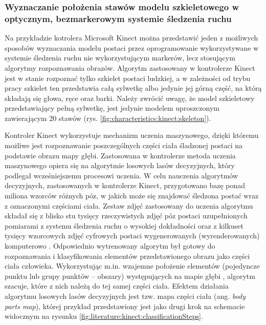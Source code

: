 	\subsubsection*{Wyznaczanie położenia stawów modelu szkieletowego w optycznym, bezmarkerowym systemie śledzenia ruchu}\label{chap:humanModel:kinect}
	Na przykładzie kotrolera Microsoft Kinect można przedstawić jeden z możliwych sposobów wyznaczania modelu postaci 
	przez oprogramowanie wykorzystywane w systemie śledzenia ruchu nie wykorzystującym markerów, lecz stosującym algorytmy rozpoznawania obrazów. Algorytm zastosowany w kontrolerze Kinect jest w stanie rozpoznać tylko szkielet postaci ludzkiej, a w zależności od trybu pracy szkielet ten przedstawia całą sylwetkę albo jedynie jej górną część, na którą składają się głowa, ręce oraz barki. Należy zwrócić uwagę, że model szkieletowy przedstawiający pełną sylwetkę, jest jedynie modelem uproszczonym zawierającym 20 stawów (rys. \ref{fig:characteristics:kinect:skeleton}).
		
	Kontroler Kinect wykorzystuje mechanizm uczenia maszynowego, dzięki któremu możliwe jest rozpoznawanie poszczególnych części ciała śladzonej postaci na podstawie obrazu mapy głębi. Zastosowana w kontrolerze metoda uczenia maszynowego opiera się na algorytmie losowych lasów decyzyjnych\cite{Criminisi2011}, który podlegał wcześniejszemu procesowi uczenia. W celu nauczenia algorytmów decyzyjnych, zastosowanych w kontrolerze Kinect, przygotowano bazę ponad miliona wzorców różnych póz, w jakich może się znajdować śledzona postać wraz z oznaczonymi częściami ciała. Zestaw zdjęć zastosowany do uczenia algorytmu składał się z blisko stu tysięcy rzeczywistych zdjęć póz postaci uzupełnionych pomiarami z systemu śledzenia ruchu o wysokiej dokładności oraz z kilkuset tysięcy wzorcowych zdjęć cyfrowych postaci wygenerowanych (wyrenderowanych) komputerowo . Odpowiednio wytrenowany algorytm był gotowy do rozpoznawania i klasyfikowania elementów przedstawionego obrazu jako części ciała człowieka. Wykorzystując m.in. wzajemne położenie elementów (pojedyncze punktu lub grupy punktów -- obszary) występujących na mapie głębi 
	, algorytm szacuje, które z nich należą do tej samej części ciała. Efektem działania algorytmu losowych lasów decyzyjnych jest tzw. mapa części ciała (ang. \emph{body parts map}), której przykład przedstawiony jest jako drugi krok na schemacie widocznym na rysunku \ref{fig:literature:kinect:classificationSteps}.
		
